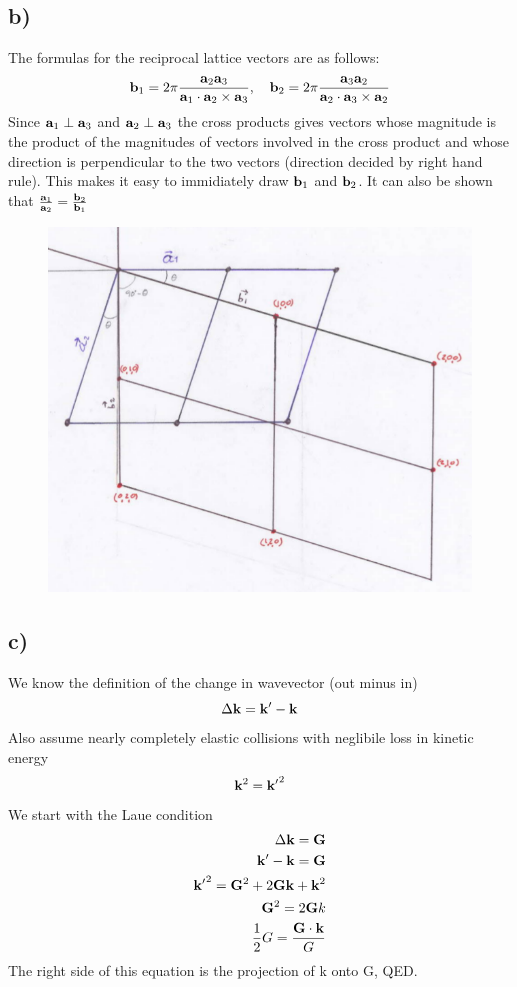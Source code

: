 \documentclass[a4paper, 11pt]{article}
\begin{document}
		\subsection*{b)}
			The formulas for the reciprocal lattice vectors are as follows:
			$$ \vb{b}_1 = 2\pi \frac{\vb{a}_2\vb{a}_3}{\vb{a}_1\cdot \vb{a}_2 \times \vb{a}_3}, \quad  \vb{b}_2 = 2\pi \frac{\vb{a}_3\vb{a}_2}{\vb{a}_2\cdot \vb{a}_3 \times \vb{a}_2}$$
			Since $\vb{a}_1\perp\vb{a}_3$ and $\vb{a}_2\perp\vb{a}_3$ the cross products gives vectors whose magnitude is the product of the magnitudes of vectors involved in the cross product and whose direction is perpendicular to the two vectors (direction decided by right hand rule). This makes it easy to immidiately draw $\vb{b}_1$ and $\vb{b}_2$.
			It can also be shown that $\frac{\vb{a}_1}{\vb{a}_2}=\frac{\vb{b}_2}{\vb{b}_1}$
			\begin{figure}[H]
				\centering
				\includegraphics[width=0.7\linewidth]{reciprocal.png}
			\end{figure}
		\subsection*{c)}
			We know the definition of the change in wavevector (out minus in)
			$$\Delta\vb{k} = \vb{k}'-\vb{k}$$
			Also assume nearly completely elastic collisions with neglibile loss in kinetic energy
			$$\vb{k}^2 = \vb{k'}^2$$
			We start with the Laue condition
			\begin{align*}
				\Delta\vb{k} = \vb{G}\\
				\vb{k'}-\vb{k} = \vb{G}\\
				\vb{k'}^2=\vb{G}^2+2\vb{G}\vb{k}+\vb{k}^2\\
				\vb{G}^2 = 2\vb{G}{k}\\
				\frac{1}{2}G = \frac{\vb{G}\cdot\vb{k}}{G}\\
			\end{align*}
			The right side of this equation is the projection of k onto G, QED.
\end{document}
